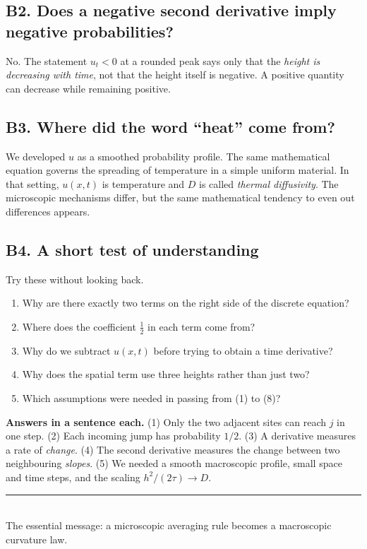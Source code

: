 \documentclass[11pt,a4paper]{article}
\begin{document}
\subsection*{B2. Does a negative second derivative imply negative probabilities?}
No. The statement $u_t<0$ at a rounded peak says only that the \emph{height is decreasing with time}, not that the height itself is negative. A positive quantity can decrease while remaining positive.

\subsection*{B3. Where did the word ``heat'' come from?}
We developed $u$ as a smoothed probability profile. The same mathematical equation governs the spreading of temperature in a simple uniform material. In that setting, $u(x,t)$ is temperature and $D$ is called \emph{thermal diffusivity}. The microscopic mechanisms differ, but the same mathematical tendency to even out differences appears.

\subsection*{B4. A short test of understanding}
Try these without looking back.
\begin{enumerate}[leftmargin=21pt,itemsep=7pt]
\item Why are there exactly two terms on the right side of the discrete equation?
\item Where does the coefficient $\tfrac12$ in each term come from?
\item Why do we subtract $u(x,t)$ before trying to obtain a time derivative?
\item Why does the spatial term use three heights rather than just two?
\item Which assumptions were needed in passing from (1) to (8)?
\end{enumerate}
\begin{takeaway}
\textbf{Answers in a sentence each.} (1) Only the two adjacent sites can reach $j$ in one step. (2) Each incoming jump has probability $1/2$. (3) A derivative measures a rate of \emph{change}. (4) The second derivative measures the change between two neighbouring \emph{slopes}. (5) We needed a smooth macroscopic profile, small space and time steps, and the scaling $h^2/(2\tau)\to D$.
\end{takeaway}

\vfill
\begin{center}
\color{muted}\rule{0.42\linewidth}{.4pt}\\[6pt]
\small The essential message: a microscopic averaging rule becomes a macroscopic curvature law.
\end{center}
\end{document}
